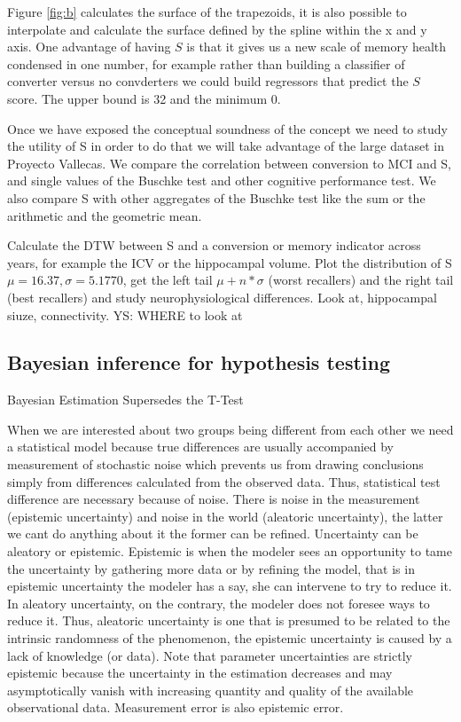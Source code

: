 \documentclass[11pt]{article}
\theoremstyle{definition}
\theoremstyle{remark}
\begin{document}
Figure \ref{fig:b} calculates the surface of the trapezoids, it is also possible to interpolate and calculate the surface defined by the spline within the x and y axis.
One  advantage of having $S$ is that it gives us a new scale of memory health condensed in one number, for example rather than building a classifier of converter versus no convderters we could build regressors that predict the $S$ score. The upper bound is 32 and the minimum 0.

Once we have exposed the conceptual soundness of the concept we need to study the utility of S in order to do that we will take advantage of the large dataset in Proyecto Vallecas.
We compare the correlation between conversion to MCI and S, and single values of the Buschke test and other cognitive performance test. We also compare S with other aggregates of the Buschke test like the sum or the arithmetic and the geometric mean.

Calculate the DTW between S and a conversion or memory indicator across years, for example the ICV or the hippocampal volume. 
Plot the distribution of S $\mu = 16.37, \sigma=5.1770$, get the left tail $\mu + n*\sigma$ (worst recallers) and the right tail (best recallers) and study neurophysiological differences. Look at, hippocampal siuze, connectivity. YS: WHERE to look at


\subsection{Bayesian inference for hypothesis testing}
\label{sse:res}
Bayesian Estimation Supersedes the T-Test
\cite{kruschke2013bayesian}

When we are interested about two groups being different from each other we need a statistical model because true differences are usually accompanied by measurement of stochastic noise which prevents us from drawing conclusions simply from differences calculated from the observed data.
Thus, statistical test difference are necessary because of noise. There is noise in the measurement (epistemic uncertainty) and noise in the world (aleatoric uncertainty), the latter we cant do anything about it the former can be refined. Uncertainty can be aleatory or epistemic. Epistemic is when the modeler sees an opportunity to tame the uncertainty by gathering more data or by refining the model, that is in epistemic uncertainty the modeler has a say, she can intervene to try to reduce it. In aleatory uncertainty, on the contrary, the modeler does not foresee ways to reduce it. Thus, aleatoric uncertainty is one that is presumed to be related to the intrinsic randomness of the phenomenon, the epistemic uncertainty is caused by a lack of knowledge (or data). Note that parameter uncertainties are strictly epistemic because the uncertainty in the estimation decreases and may asymptotically vanish with increasing quantity and quality of the available observational data. 
Measurement error is also epistemic error.
\end{document}
